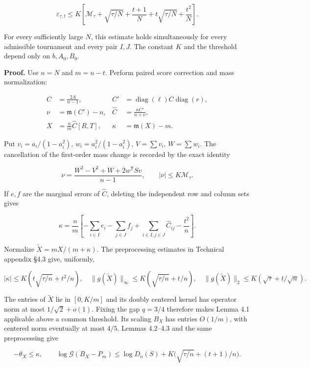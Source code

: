\documentclass[11pt,a4paper]{article}
\begin{document}
\[
\varepsilon_{\tau,t}\le K\left[
\mathcal M_\tau+\sqrt{\tau/N}+\frac{t+1}{N}
+t\sqrt{\tau/N}+\frac{t^2}{N}\right].
\]

For every sufficiently large \(N\), this estimate holds simultaneously for every admissible tournament and every pair \(I,J\). The constant \(K\) and the threshold depend only on \(b,A_0,B_0\).

\textbf{Proof.} Use \(n=N\) and \(m=n-t\). Perform paired score correction and mass normalization:

\[
\begin{aligned}
C&=\frac{2A}{n-1}, & C'&=\operatorname{diag}(\ell)C\operatorname{diag}(r),\\
\nu&=\mathfrak m(C')-n, & \widehat C&=\frac{nC'}{n+\nu},\\
X&=\frac nm\widehat C[R,T], & \kappa&=\mathfrak m(X)-m.
\end{aligned}
\]

Put \(v_i=a_i/(1-a_i^2)\), \(w_i=a_i^2/(1-a_i^2)\), \(V=\sum v_i\), \(W=\sum w_i\). The cancellation of the first-order mass change is recorded by the exact identity

\[
\nu=\frac{W^2-V^2+W+2w^{\mathsf T}Sv}{n-1},\qquad |\nu|\le K\mathcal M_\tau.
\]

If \(e,f\) are the marginal errors of \(\widehat C\), deleting the independent row and column sets gives

\begin{equation}
\kappa=\frac nm\left[-\sum_{i\in I}e_i-\sum_{j\in J}f_j
+\sum_{i\in I,j\in J}\widehat C_{ij}-\frac{t^2}{n}\right].\tag{4.1}
\label{eq-deletion-mass}
\end{equation}

Normalize \(\widetilde X=mX/(m+\kappa)\). The preprocessing estimates in Technical appendix §4.3 give, uniformly,

\[
|\kappa|\le K(t\sqrt{\tau/n}+t^2/n),\quad
\|g(\widetilde X)\|_\infty\le K(\sqrt{\tau/n}+t/n),\quad
\|g(\widetilde X)\|_2\le K(\sqrt\tau+t/\sqrt n).
\]

The entries of \(\widetilde X\) lie in \([0,K/m]\) and its doubly centered kernel has operator norm at most \(1/\sqrt2+o(1)\). Fixing the gap \(q=3/4\) therefore makes Lemma 4.1 applicable above a common threshold. Its scaling \(B_X\) has entries \(O(1/m)\), with centered norm eventually at most \(4/5\). Lemmas 4.2--4.3 and the same preprocessing give

\[
-\theta_X\le\kappa,\qquad
\log\mathcal G(B_X-P_m)\le\log D_n(S)+K\bigl(\sqrt{\tau/n}+(t+1)/n\bigr).
\]
\end{document}

